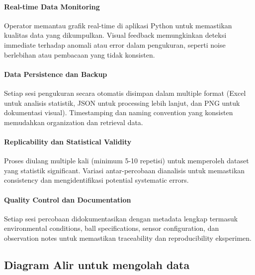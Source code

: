 \paragraph{Real-time Data Monitoring} Operator memantau grafik real-time di aplikasi Python untuk memastikan kualitas data yang dikumpulkan. Visual feedback memungkinkan deteksi immediate terhadap anomali atau error dalam pengukuran, seperti noise berlebihan atau pembacaan yang tidak konsisten.

\paragraph{Data Persistence dan Backup} Setiap sesi pengukuran secara otomatis disimpan dalam multiple format (Excel untuk analisis statistik, JSON untuk processing lebih lanjut, dan PNG untuk dokumentasi visual). Timestamping dan naming convention yang konsisten memudahkan organization dan retrieval data.

\paragraph{Replicability dan Statistical Validity} Proses diulang multiple kali (minimum 5-10 repetisi) untuk memperoleh dataset yang statistik significant. Variasi antar-percobaan dianalisis untuk memastikan consistency dan mengidentifikasi potential systematic errors.

\paragraph{Quality Control dan Documentation} Setiap sesi percobaan didokumentasikan dengan metadata lengkap termasuk environmental conditions, ball specifications, sensor configuration, dan observation notes untuk memastikan traceability dan reproducibility eksperimen.

\newpage

\subsection{Diagram Alir untuk mengolah data}

